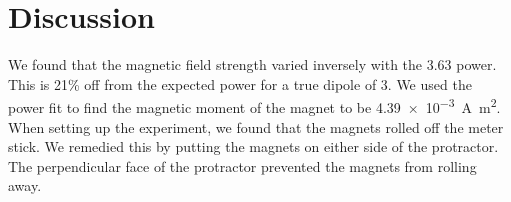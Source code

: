 \documentclass{article}
\begin{document}
\section{Discussion}

We found that the magnetic field strength varied inversely with the 3.63 power.
This is 21\% off from the expected power for a true dipole of 3. We used the
power fit to find the magnetic moment of the magnet to be
\SI{4.39e-3}{\ampere\meter\squared}. When setting up the experiment, we found
that the magnets rolled off the meter stick. We remedied this by putting the
magnets on either side of the protractor. The perpendicular face of the
protractor prevented the magnets from rolling away.
\end{document}
